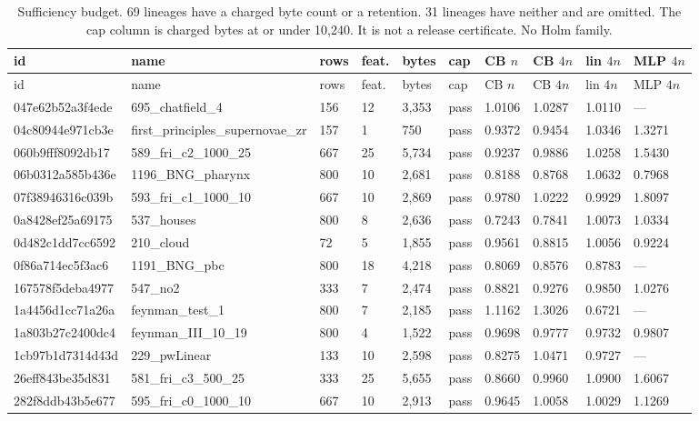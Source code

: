 \scriptsize
\begin{longtable}{llllllllll}
\caption{Sufficiency budget. 69 lineages have a charged byte count or a retention. 31 lineages have neither and are omitted. The cap column is charged bytes at or under 10{,}240. It is not a release certificate. No Holm family.}\\
\toprule
id & name & rows & feat. & bytes & cap & CB $n$ & CB $4n$ & lin $4n$ & MLP $4n$\\
\midrule
\endfirsthead
\toprule
id & name & rows & feat. & bytes & cap & CB $n$ & CB $4n$ & lin $4n$ & MLP $4n$\\
\midrule
\endhead
\bottomrule
\endfoot
047e62b52a3f4ede & 695\_chatfield\_4 & 156 & 12 & 3,353 & pass & 1.0106 & 1.0287 & 1.0110 & ---\\
04c80944e971cb3e & first\_principles\_supernovae\_zr & 157 & 1 & 750 & pass & 0.9372 & 0.9454 & 1.0346 & 1.3271\\
060b9fff8092db17 & 589\_fri\_c2\_1000\_25 & 667 & 25 & 5,734 & pass & 0.9237 & 0.9886 & 1.0258 & 1.5430\\
06b0312a585b436e & 1196\_BNG\_pharynx & 800 & 10 & 2,681 & pass & 0.8188 & 0.8768 & 1.0632 & 0.7968\\
07f38946316c039b & 593\_fri\_c1\_1000\_10 & 667 & 10 & 2,869 & pass & 0.9780 & 1.0222 & 0.9929 & 1.8097\\
0a8428ef25a69175 & 537\_houses & 800 & 8 & 2,636 & pass & 0.7243 & 0.7841 & 1.0073 & 1.0334\\
0d482c1dd7cc6592 & 210\_cloud & 72 & 5 & 1,855 & pass & 0.9561 & 0.8815 & 1.0056 & 0.9224\\
0f86a714ec5f3ac6 & 1191\_BNG\_pbc & 800 & 18 & 4,218 & pass & 0.8069 & 0.8576 & 0.8783 & ---\\
167578f5deba4977 & 547\_no2 & 333 & 7 & 2,474 & pass & 0.8821 & 0.9276 & 0.9850 & 1.0276\\
1a4456d1cc71a26a & feynman\_test\_1 & 800 & 7 & 2,185 & pass & 1.1162 & 1.3026 & 0.6721 & ---\\
1a803b27c2400dc4 & feynman\_III\_10\_19 & 800 & 4 & 1,522 & pass & 0.9698 & 0.9777 & 0.9732 & 0.9807\\
1cb97b1d7314d43d & 229\_pwLinear & 133 & 10 & 2,598 & pass & 0.8275 & 1.0471 & 0.9727 & ---\\
26eff843be35d831 & 581\_fri\_c3\_500\_25 & 333 & 25 & 5,655 & pass & 0.8660 & 0.9960 & 1.0900 & 1.6067\\
282f8ddb43b5e677 & 595\_fri\_c0\_1000\_10 & 667 & 10 & 2,913 & pass & 0.9645 & 1.0058 & 1.0029 & 1.1269\\

\end{longtable}
